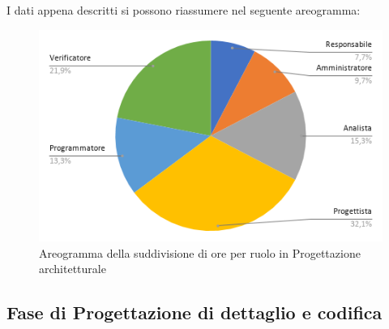 I dati appena descritti si possono riassumere nel seguente areogramma:
\begin{figure}[!h]
    \vspace{5px}
    \includegraphics[scale=0.5]{../../../Images/Diagrammi/Diagramma a torta/ore architettura.png}
    \centering
    \caption{Areogramma della suddivisione di ore per ruolo in Progettazione architetturale}
\end{figure}


\subsection{Fase di Progettazione di dettaglio e codifica}

